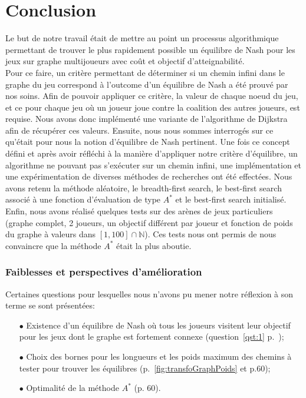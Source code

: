 
\section{Conclusion}

Le but de notre travail était de mettre au point un processus algorithmique permettant de trouver le plus rapidement possible un équilibre de Nash pour les jeux sur graphe multijoueurs avec coût et objectif d'atteignabilité. \\

Pour ce faire, un critère permettant de déterminer si un chemin infini dans le graphe du jeu correspond à l'outcome d'un équilibre de Nash a été prouvé par nos soins. Afin de pouvoir appliquer ce critère, la valeur de chaque noeud du jeu, et ce pour chaque jeu où un joueur joue contre la coalition des autres joueurs, est requise. Nous avons donc implémenté une variante de l'algorithme de Dijkstra afin de récupérer ces valeurs. Ensuite, nous nous sommes interrogés sur ce qu'était pour nous la notion d'équilibre de Nash pertinent. Une fois ce concept défini et après avoir réfléchi à la manière d'appliquer notre critère d'équilibre, un algorithme ne pouvant pas s'exécuter sur un chemin infini, une implémentation et une expérimentation de diverses méthodes de recherches ont été effectées. Nous avons retenu la méthode aléatoire, le breadth-first search, le best-first search associé à une fonction d'évaluation de type $A^*$ et le best-first search initialisé. Enfin, nous avons réalisé quelques tests sur des arènes de jeux particuliers (graphe complet, 2 joueurs, un objectif différent par joueur et fonction de poids du graphe à valeurs dans $[1, 100] \cap \mathbb{N}$). Ces tests nous ont permis de nous convaincre que la méthode $A^*$ était la plus aboutie.\\

\subsubsection*{Faiblesses et perspectives d'amélioration}

Certaines questions pour lesquelles nous n'avons pu mener notre réflexion à son terme se sont présentées:
\begin{itemize}
	\item[$\bullet$] Existence d'un équilibre de Nash où tous les joueurs visitent leur objectif pour les jeux dont le graphe est fortement connexe (question~\ref{qst:1} p.~\pageref{qst:1});
	\item[$\bullet$] Choix des bornes pour les longueurs et les poids maximum des chemins à tester pour trouver les équilibres (p.~\ref{fig:transfoGraphPoids} et p.60);
	\item[$\bullet$] Optimalité de la méthode $A^*$ (p. 60).
\end{itemize}


